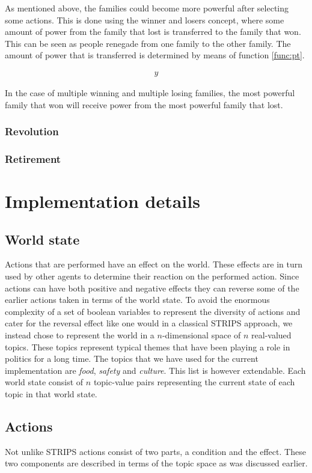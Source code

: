 \documentclass[11pt,a4paper]{article}
\begin{document}
As mentioned above, the families could become more powerful after selecting some actions. This is done using the winner and losers concept, where some amount of power from the  family that lost is transferred to the family that won. This can be seen as people renegade from one family to the other family. The amount of power that is transferred is determined by means of function \ref{func:pt}. 

\begin{align}
y
\label{func:pt}
\end{align}

In the case of multiple winning and multiple losing families, the most powerful family that won will receive power from the most powerful family that lost. 

  \subsubsection{Revolution}
  \subsubsection{Retirement}
  

\section{Implementation details}
  \subsection{World state}
    Actions that are performed have an effect on the world. These effects are in turn used by other agents to determine their reaction on the performed action. Since actions can have both positive and negative effects they can reverse some of the earlier actions taken in terms of the world state. To avoid the enormous complexity of a set of boolean variables to represent the diversity of actions and cater for the reversal effect like one would in a classical STRIPS approach, we instead chose to represent the world in a $n$-dimensional space of $n$ real-valued topics. These topics represent typical themes that have been playing a role in politics for a long time. The topics that we have used for the current implementation are \emph{food}, \emph{safety} and \emph{culture}. This list is however extendable. Each world state consist of $n$ topic-value pairs representing the current state of each topic in that world state.
  \subsection{Actions}
    Not unlike STRIPS actions consist of two parts, a condition and the effect. These two components are described in terms of the topic space as was discussed earlier.
\end{document}
